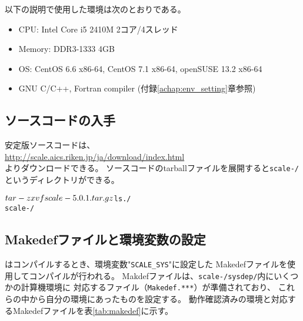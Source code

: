 以下の説明で使用した環境は次のとおりである。
\begin{itemize}
\item CPU: Intel Core i5 2410M 2コア/4スレッド
\item Memory: DDR3-1333 4GB
\item OS: CentOS 6.6 x86-64, CentOS 7.1 x86-64, openSUSE 13.2 x86-64
\item GNU C/C++, Fortran compiler (付録\ref{achap:env_setting}章参照)
\end{itemize}

\subsection{ソースコードの入手} \label{subsec:get_source_code}
安定版ソースコードは、\\
 \url{http://scale.aics.riken.jp/ja/download/index.html}\\
よりダウンロードできる。
ソースコードのtarballファイルを展開すると\texttt{scale-{\version}/}というディレクトリができる。
\begin{alltt}
 $ tar -zxvf scale-{\version}.tar.gz
 $ ls ./
   scale-{\version}/
\end{alltt}

\subsection{Makedefファイルと環境変数の設定} \label{subsec:evniromnet}

\scalelib はコンパイルするとき、環境変数"\verb|SCALE_SYS|"に設定した
Makedefファイルを使用してコンパイルが行われる。
Makdefファイルは、\texttt{scale-{\version}/sysdep/}内にいくつかの計算機環境に
対応するファイル（\texttt{Makedef.***}）が準備されており、
これらの中から自分の環境にあったものを設定する。
動作確認済みの環境と対応するMakedefファイルを表\ref{tab:makedef}に示す。

